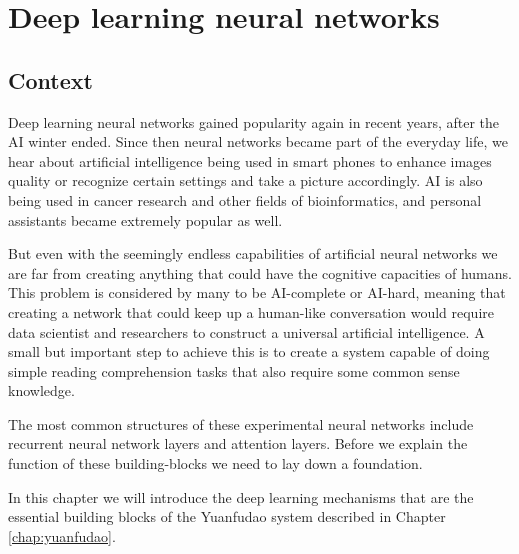\chapter{Deep learning neural networks}
\label{chap:deep}
\section{Context}
Deep learning neural networks gained popularity again in recent years, after the AI winter ended. Since then neural networks became part of the everyday life, we hear about artificial intelligence being used in smart phones to enhance images quality or recognize certain settings and take a picture accordingly. AI is also being used in cancer research and other fields of bioinformatics, and personal assistants became extremely popular as well.

But even with the seemingly endless capabilities of artificial neural networks we are far from creating anything that could have the cognitive capacities of humans. This problem is considered by many to be AI-complete or AI-hard, meaning that creating a network that could keep up a human-like conversation would require data scientist and researchers to construct a universal artificial intelligence. A small but important step to achieve this is to create a system capable of doing simple reading comprehension tasks that also require some common sense knowledge.

The most common structures of these experimental neural networks include recurrent neural network layers and attention layers. Before we explain the function of these building-blocks we need to lay down a foundation.

In this chapter we will introduce the deep learning mechanisms that are the essential building blocks of the Yuanfudao system described in Chapter \ref{chap:yuanfudao}.

